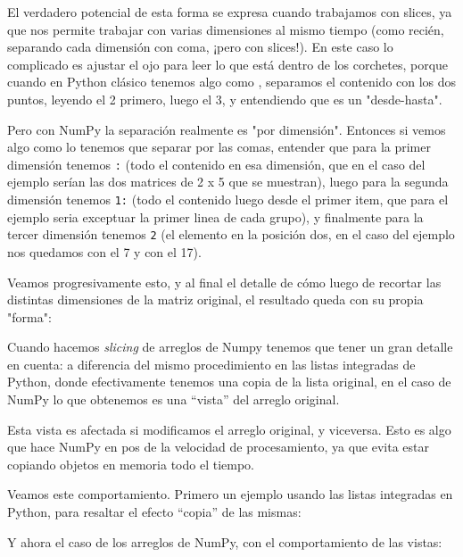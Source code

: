 
El verdadero potencial de esta forma se expresa cuando trabajamos con slices, ya que nos permite trabajar con varias dimensiones al mismo tiempo (como recién, separando cada dimensión con coma, ¡pero con slices!). En este caso lo complicado es ajustar el ojo para leer lo que está dentro de los corchetes, porque cuando en Python clásico tenemos algo como \mip{[2:5]}, separamos el contenido con los dos puntos, leyendo el 2 primero, luego el 3, y entendiendo que es un "desde-hasta".

Pero con NumPy la separación realmente es "por dimensión". Entonces si vemos algo como  lo tenemos que separar por las comas, entender que para la primer dimensión tenemos \texttt{:} (todo el contenido en esa dimensión, que en el caso del ejemplo serían las dos matrices de 2 x 5 que se muestran), luego para la segunda dimensión tenemos \texttt{1:} (todo el contenido luego desde el primer item, que para el ejemplo seria exceptuar la primer linea de cada grupo), y finalmente para la tercer dimensión tenemos \texttt{2} (el elemento en la posición dos, en el caso del ejemplo nos quedamos con el 7 y con el 17).

Veamos progresivamente esto, y al final el detalle de cómo luego de recortar las distintas dimensiones de la matriz original, el resultado queda con su propia "forma":


Cuando hacemos \textit{slicing} de arreglos de Numpy tenemos que tener un gran detalle en cuenta: a diferencia del mismo procedimiento en las listas integradas de Python, donde efectivamente tenemos una copia de la lista original, en el caso de NumPy lo que obtenemos es una ``vista'' del arreglo original.

Esta vista es afectada si modificamos el arreglo original, y viceversa. Esto es algo que hace NumPy en pos de la velocidad de procesamiento, ya que evita estar copiando objetos en memoria todo el tiempo.

Veamos este comportamiento. Primero un ejemplo usando las listas integradas en Python, para resaltar el efecto ``copia'' de las mismas:


Y ahora el caso de los arreglos de NumPy, con el comportamiento de las vistas:



